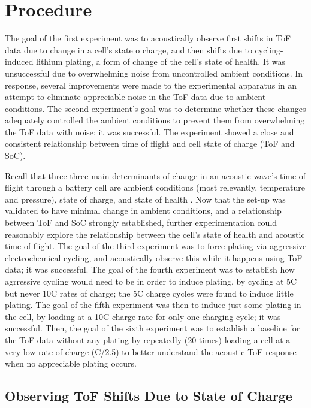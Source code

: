 \chapter{Procedure}
The goal of the first experiment was to acoustically observe first shifts in ToF data due to change in a cell's state o charge, and then shifts due to cycling-induced lithium plating, a form of change of the cell's state of health. It was unsuccessful due to overwhelming noise from uncontrolled ambient conditions. In response, several improvements were made to the experimental apparatus in an attempt to eliminate appreciable noise in the ToF data due to ambient conditions. The second experiment's goal was to determine whether these changes adequately controlled the ambient conditions to prevent them from overwhelming the ToF data with noise; it was successful. The experiment showed a close and consistent relationship between time of flight and cell state of charge (ToF and SoC).

Recall that three three main determinants of change in an acoustic wave's time of flight through a battery cell are ambient conditions (most relevantly, temperature and pressure), state of charge, and state of health . Now that the set-up was validated to have minimal change in ambient conditions, and a relationship between ToF and SoC strongly established, further experimentation could reasonably explore the relationship between the cell's state of health and acoustic time of flight. The goal of the third experiment was to force plating via aggressive electrochemical cycling, and acoustically observe this while it happens using ToF data; it was successful. The goal of the fourth experiment was to establish how agrressive cycling would need to be in order to induce plating, by cycling at 5C but never 10C rates of charge; the 5C charge cycles were found to induce little plating. The goal of the fifth experiment was then to induce just some plating in the cell, by loading at a 10C charge rate for only one charging cycle; it was successful. Then, the goal of the sixth experiment was to establish a baseline for the ToF data without any plating by repeatedly (20 times) loading a cell at a very low rate of charge (C/2.5) to better understand the acoustic ToF response when no appreciable plating occurs.

\section{Observing ToF Shifts Due to State of Charge}

